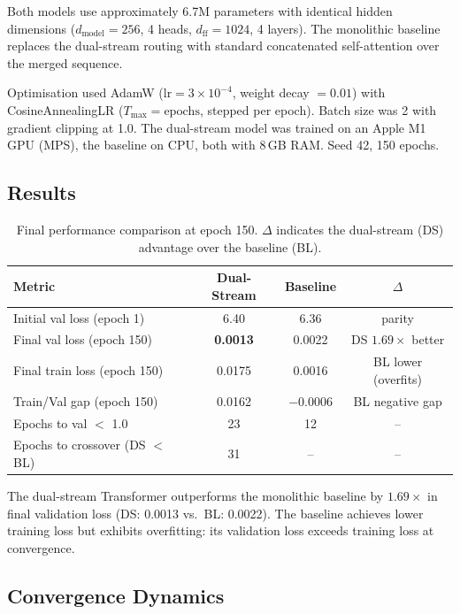 \documentclass[11pt,a4paper]{article}
\theoremstyle{definition}
\begin{document}
Both models use approximately 6.7M parameters with identical hidden dimensions ($d_\text{model} = 256$, 4 heads, $d_\text{ff} = 1024$, 4 layers). The monolithic baseline replaces the dual-stream routing with standard concatenated self-attention over the merged sequence.

Optimisation used AdamW ($\text{lr}=3 \times 10^{-4}$, weight decay $=0.01$) with CosineAnnealingLR ($T_\text{max} = \text{epochs}$, stepped per epoch). Batch size was 2 with gradient clipping at 1.0. The dual-stream model was trained on an Apple M1 GPU (MPS), the baseline on CPU, both with 8\,GB RAM. Seed 42, 150 epochs.

\subsection{Results}

\begin{table}[H]
  \centering
  \caption{Final performance comparison at epoch 150. $\Delta$ indicates the dual-stream (DS) advantage over the baseline (BL).}
  \label{tab:results}
  \begin{tabular}{lccc}
    \toprule
    Metric & Dual-Stream & Baseline & $\Delta$ \\
    \midrule
    Initial val loss (epoch 1) & 6.40 & 6.36 & parity \\
    Final val loss (epoch 150) & \textbf{0.0013} & 0.0022 & DS $1.69\times$ better \\
    Final train loss (epoch 150) & 0.0175 & 0.0016 & BL lower (overfits) \\
    Train/Val gap (epoch 150) & 0.0162 & $-$0.0006 & BL negative gap \\
    Epochs to val $<$ 1.0 & 23 & 12 & -- \\
    Epochs to crossover (DS $<$ BL) & 31 & -- & -- \\
    \bottomrule
  \end{tabular}
\end{table}

The dual-stream Transformer outperforms the monolithic baseline by $1.69\times$ in final validation loss (DS: 0.0013 vs.\ BL: 0.0022). The baseline achieves lower training loss but exhibits overfitting: its validation loss exceeds training loss at convergence.

\subsection{Convergence Dynamics}
\end{document}
